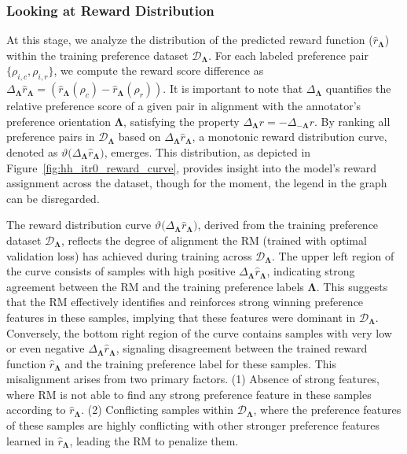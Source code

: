 \subsubsection{Looking at Reward Distribution}
\label{sec:leveraging_reward_score}
At this stage, we analyze the distribution of the predicted reward function ($\hat{r}_{\mathbf{\Lambda}}$) within the training preference dataset $\mathcal{D}_{\mathbf{\Lambda}}$. For each labeled preference pair $\{\rho_{i,c}, \rho_{i,r}\}$, we compute the reward score difference as $ \Delta_{\mathbf{\Lambda}}{\hat{r}_\mathbf{\Lambda}} = (\hat{r}_{\mathbf{\Lambda}}(\rho_{c}) - \hat{r}_{\mathbf{\Lambda}}(\rho_{r}))$. It is important to note that $\Delta_{\mathbf{\Lambda}}$ quantifies the relative preference score of a given pair in alignment with the annotator's preference orientation $\mathbf{\Lambda}$, satisfying the property $\Delta_{\mathbf{\Lambda}}{r} = - \Delta_{\mathbf{-\Lambda}}{r}$. By ranking all preference pairs in $\mathcal{D}_{\mathbf{\Lambda}}$ based on $\Delta_{\mathbf{\Lambda}}{\hat{r}_\mathbf{\Lambda}}$, a monotonic reward distribution curve, denoted as $\vartheta(\Delta_{\mathbf{\Lambda}}{\hat{r}_\mathbf{\Lambda})}$, emerges. This distribution, as depicted in Figure~\ref{fig:hh_itr0_reward_curve}, provides insight into the model’s reward assignment across the dataset, though for the moment, the legend in the graph can be disregarded. 

The reward distribution curve $\vartheta(\Delta_{\mathbf{\Lambda}}{\hat{r}_\mathbf{\Lambda})}$, derived from the training preference dataset $\mathcal{D}_{\mathbf{\Lambda}}$, reflects the degree of alignment the RM (trained with optimal validation loss) has achieved during training across $\mathcal{D}_{\mathbf{\Lambda}}$. The upper left region of the curve consists of samples with high positive $\Delta_{\mathbf{\Lambda}}\hat{r}_\mathbf{\Lambda}$, indicating strong agreement between the RM and the training preference labels $\mathbf{\Lambda}$. This suggests that the RM effectively identifies and reinforces strong winning preference features in these samples, implying that these features were dominant in $\mathcal{D}_{\mathbf{\Lambda}}$. Conversely, the bottom right region of the curve contains samples with very low or even negative $\Delta_{\mathbf{\Lambda}}\hat{r}_\mathbf{\Lambda}$, signaling disagreement between the trained reward function $\hat{r}_\mathbf{\Lambda}$ and the training preference label for these samples. This misalignment arises from two primary factors. (1) Absence of strong features, where RM is not able to find any strong preference feature in these samples according to $\hat{r}_\mathbf{\Lambda}$. (2) Conflicting samples within $\mathcal{D}_{\mathbf{\Lambda}}$, where the preference features of these samples are highly conflicting with other stronger preference features learned in $\hat{r}_\mathbf{\Lambda}$, leading the RM to penalize them.

